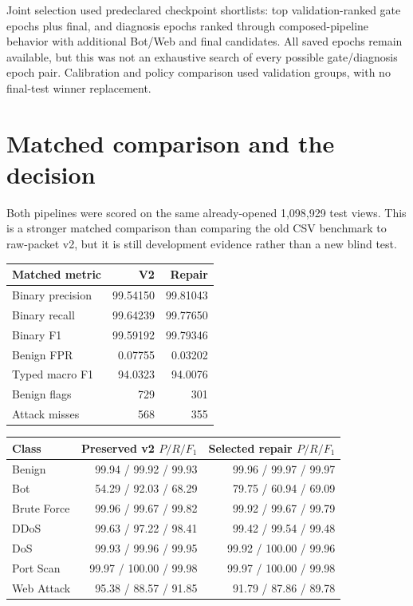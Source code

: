 \documentclass[11pt,a4paper,oneside]{report}
\begin{document}
Joint selection used predeclared checkpoint shortlists: top validation-ranked gate epochs plus final, and diagnosis epochs ranked through composed-pipeline behavior with additional Bot/Web and final candidates. All saved epochs remain available, but this was not an exhaustive search of every possible gate/diagnosis epoch pair. Calibration and policy comparison used validation groups, with no final-test winner replacement.

\section{Matched comparison and the decision}
Both pipelines were scored on the same already-opened 1,098,929 test views. This is a stronger matched comparison than comparing the old CSV benchmark to raw-packet v2, but it is still development evidence rather than a new blind test.

{\small
\begin{longtable}{@{}lrr@{}}
\toprule
Matched metric & V2 & Repair\\\midrule\endhead
Binary precision & 99.54150 & 99.81043\\
Binary recall & 99.64239 & 99.77650\\
Binary F1 & 99.59192 & 99.79346\\
Benign FPR & 0.07755 & 0.03202\\
Typed macro F1 & 94.0323 & 94.0076\\
Benign flags & 729 & 301\\
Attack misses & 568 & 355\\
\bottomrule\end{longtable}
}


{\small
\begin{longtable}{@{}lrr@{}}
\toprule
Class & Preserved v2 $P/R/F_1$ & Selected repair $P/R/F_1$\\\midrule\endhead
Benign & 99.94 / 99.92 / 99.93 & 99.96 / 99.97 / 99.97\\
Bot & 54.29 / 92.03 / 68.29 & 79.75 / 60.94 / 69.09\\
Brute Force & 99.96 / 99.67 / 99.82 & 99.92 / 99.67 / 99.79\\
DDoS & 99.63 / 97.22 / 98.41 & 99.42 / 99.54 / 99.48\\
DoS & 99.93 / 99.96 / 99.95 & 99.92 / 100.00 / 99.96\\
Port Scan & 99.97 / 100.00 / 99.98 & 99.97 / 100.00 / 99.98\\
Web Attack & 95.38 / 88.57 / 91.85 & 91.79 / 87.86 / 89.78\\
\bottomrule\end{longtable}
}
\end{document}

